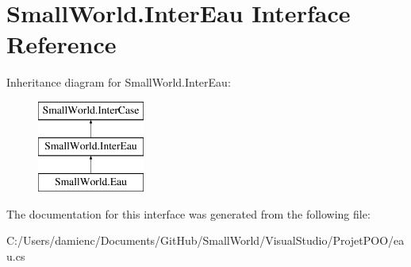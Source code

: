 \hypertarget{interface_small_world_1_1_inter_eau}{\section{Small\-World.\-Inter\-Eau Interface Reference}
\label{interface_small_world_1_1_inter_eau}
}
Inheritance diagram for Small\-World.\-Inter\-Eau\-:\begin{figure}[H]
\begin{center}
\leavevmode
\includegraphics[height=3.000000cm]{interface_small_world_1_1_inter_eau}
\end{center}
\end{figure}


The documentation for this interface was generated from the following file\-:\begin{DoxyCompactItemize}
\item 
C\-:/\-Users/damienc/\-Documents/\-Git\-Hub/\-Small\-World/\-Visual\-Studio/\-Projet\-P\-O\-O/eau.\-cs\end{DoxyCompactItemize}
